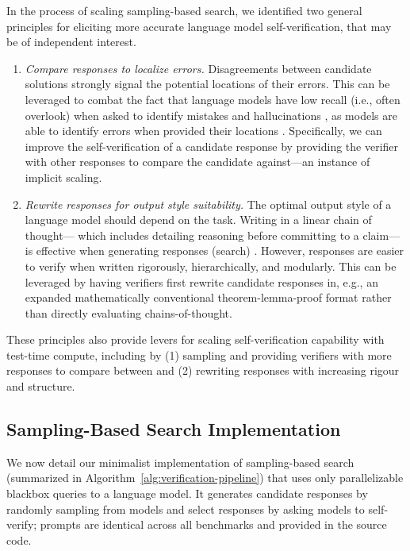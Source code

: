 \noindent
In the process of scaling sampling-based search, we identified two general principles for eliciting more accurate language model self-verification, that may be of independent interest.
\begin{enumerate}
    \item \emph{Compare responses to localize errors.} 
    Disagreements between candidate solutions strongly signal the potential locations of their errors.
    This can be leveraged to combat the fact that language models have low recall (i.e., often overlook) when asked to identify mistakes and hallucinations \citep{tyen_llms_2024,kamoi_evaluating_2024}, as models are able to identify errors when provided their locations  \citep{tyen_llms_2024}.
    Specifically, we can improve the self-verification of a candidate response by providing the verifier with other responses to compare the candidate against---an instance of implicit scaling.

    \item \emph{Rewrite responses for output style suitability.}
    The optimal output style of a language model should depend on the task.
    Writing in a linear chain of thought--- which includes detailing reasoning before committing to a claim---is effective when generating responses (search) \citep{DBLP:conf/nips/Wei0SBIXCLZ22}.
    However, responses are easier to verify when written rigorously, hierarchically, and modularly.
    This can be leveraged by having verifiers first rewrite candidate responses in, e.g., an expanded mathematically conventional theorem-lemma-proof format rather than directly evaluating chains-of-thought.
\end{enumerate}

\noindent
These principles also provide levers for scaling self-verification capability with test-time compute, including by (1) sampling and providing verifiers with more responses to compare between and (2) rewriting responses with increasing rigour and structure.

\subsection{Sampling-Based Search Implementation}
We now detail our minimalist implementation of sampling-based search (summarized in Algorithm~\ref{alg:verification-pipeline}) that uses only parallelizable blackbox queries to a language model.
It generates candidate responses by randomly sampling from models and select responses by asking models to self-verify; prompts are identical across all benchmarks and provided in the source code.


